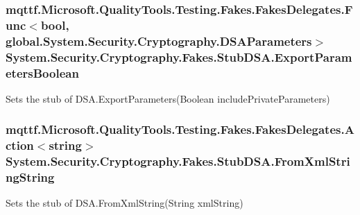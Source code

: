 \hypertarget{class_system_1_1_security_1_1_cryptography_1_1_fakes_1_1_stub_d_s_a_afab6a4c270991917e426323ed509e462}{
\subsubsection[{Export\-Parameters\-Boolean}]{\setlength{\rightskip}{0pt plus 5cm}mqttf.\-Microsoft.\-Quality\-Tools.\-Testing.\-Fakes.\-Fakes\-Delegates.\-Func$<$bool, global.\-System.\-Security.\-Cryptography.\-D\-S\-A\-Parameters$>$ System.\-Security.\-Cryptography.\-Fakes.\-Stub\-D\-S\-A.\-Export\-Parameters\-Boolean}}\label{class_system_1_1_security_1_1_cryptography_1_1_fakes_1_1_stub_d_s_a_afab6a4c270991917e426323ed509e462}


Sets the stub of D\-S\-A.\-Export\-Parameters(\-Boolean include\-Private\-Parameters)

\hypertarget{class_system_1_1_security_1_1_cryptography_1_1_fakes_1_1_stub_d_s_a_ac2a12acc53aa0272e3abd250ae72048d}{
\subsubsection[{From\-Xml\-String\-String}]{\setlength{\rightskip}{0pt plus 5cm}mqttf.\-Microsoft.\-Quality\-Tools.\-Testing.\-Fakes.\-Fakes\-Delegates.\-Action$<$string$>$ System.\-Security.\-Cryptography.\-Fakes.\-Stub\-D\-S\-A.\-From\-Xml\-String\-String}}\label{class_system_1_1_security_1_1_cryptography_1_1_fakes_1_1_stub_d_s_a_ac2a12acc53aa0272e3abd250ae72048d}


Sets the stub of D\-S\-A.\-From\-Xml\-String(\-String xml\-String)

